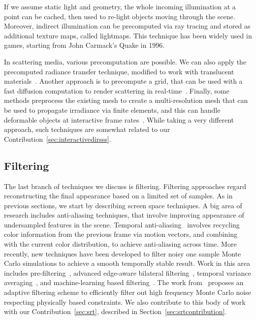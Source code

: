 If we assume static light and geometry, the whole incoming illumination at a point can be cached, then used to re-light objects moving through the scene. Moreover, indirect illumination can be precomputed via ray tracing and stored as additional texture maps, called lightmaps. This technique has been widely used in games, starting from John Carmack's Quake in 1996.    

In scattering media, various precomputation are possible. We can also apply the precomputed radiance transfer technique, modified to work with translucent materials~\cite{Sloan2003}. Another approach is to precompute a grid, that can be used with a fast diffusion computation to render scattering in real-time~\cite{Wang2008a}. Finally, some methods preprocess the existing mesh to create a multi-resolution mesh that can be used to propagate irradiance via finite elements, and this can handle deformable objects at interactive frame rates~\cite{Mertens2003, Li2013}. While taking a very different approach, such techniques are somewhat related to our Contribution~\ref{sec:interactivedirsss}.

\subsection{Filtering}

The last branch of techniques we discuss is filtering. Filtering approaches regard reconstructing the final appearance based on a limited set of samples. As in previous sections, we start by describing screen space techniques. A big area of research includes anti-aliasing techniques, that involve improving appearance of undersampled features in the scene. Temporal anti-aliasing~\cite{Karis2014,Patney2016} involves recycling color information from the previous frame via motion vectors, and combining with the current color distribution, to achieve anti-aliasing across time. More recently, new techniques have been developed to filter noisy one sample Monte Carlo simulations to achieve a smooth temporally stable result. Work in this area includes pre-filtering~\cite{Crassin2015}, advanced edge-aware bilateral filtering~\cite{Mara2017}, temporal variance averaging~\cite{Schied17}, and machine-learning based filtering~\cite{Chaitanya2017}. The work from~\citet{Mehta2013} proposes an adaptive filtering scheme to efficiently filter out high frequency Monte Carlo noise respecting physically based constraints. We also contribute to this body of work with our Contribution~\ref{sec:srt}, described in Section~\ref{sec:srtcontribution}.

